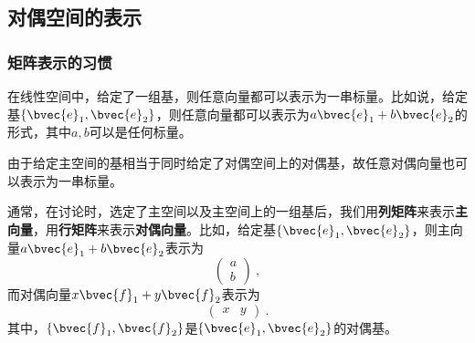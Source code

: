 




\subsection{对偶空间的表示}\label{sub_DualSp_1}


\subsubsection{矩阵表示的习惯}


在线性空间中，给定了一组基，则任意向量都可以表示为一串标量。比如说，给定基$\{\bvec{e}_1, \bvec{e}_2\}$，则任意向量都可以表示为$a\bvec{e}_1+b\bvec{e}_2$的形式，其中$a, b$可以是任何标量。


由于给定主空间的基相当于同时给定了对偶空间上的对偶基，故任意对偶向量也可以表示为一串标量。


通常，在讨论时，选定了主空间以及主空间上的一组基后，我们用\textbf{列矩阵}来表示\textbf{主向量}，用\textbf{行矩阵}来表示\textbf{对偶向量}。比如，给定基$\{\bvec{e}_1, \bvec{e}_2\}$，则主向量$a\bvec{e}_1+b\bvec{e}_2$表示为
\begin{equation}
\begin{pmatrix}
a\\
b
\end{pmatrix}~, 
\end{equation}
而对偶向量$x\bvec{f}_1+y\bvec{f}_2$表示为
\begin{equation}
\begin{pmatrix}
x&y
\end{pmatrix}~. 
\end{equation}
其中，$\{\bvec{f}_1, \bvec{f}_2\}$是$\{\bvec{e}_1, \bvec{e}_2\}$的对偶基。

